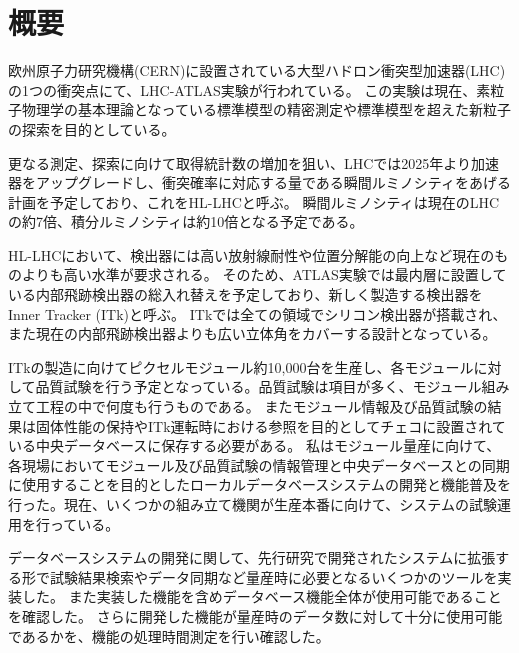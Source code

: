 \chapter*{概要}

欧州原子力研究機構(CERN)に設置されている大型ハドロン衝突型加速器(LHC)の1つの衝突点にて、LHC-ATLAS実験が行われている。
この実験は現在、素粒子物理学の基本理論となっている標準模型の精密測定や標準模型を超えた新粒子の探索を目的としている。

更なる測定、探索に向けて取得統計数の増加を狙い、LHCでは2025年より加速器をアップグレードし、衝突確率に対応する量である瞬間ルミノシティをあげる計画を予定しており、これをHL-LHCと呼ぶ。
瞬間ルミノシティは現在のLHCの約7倍、積分ルミノシティは約10倍となる予定である。

HL-LHCにおいて、検出器には高い放射線耐性や位置分解能の向上など現在のものよりも高い水準が要求される。
そのため、ATLAS実験では最内層に設置している内部飛跡検出器の総入れ替えを予定しており、新しく製造する検出器をInner Tracker (ITk)と呼ぶ。
ITkでは全ての領域でシリコン検出器が搭載され、また現在の内部飛跡検出器よりも広い立体角をカバーする設計となっている。

ITkの製造に向けてピクセルモジュール約10,000台を生産し、各モジュールに対して品質試験を行う予定となっている。品質試験は項目が多く、モジュール組み立て工程の中で何度も行うものである。
またモジュール情報及び品質試験の結果は固体性能の保持やITk運転時における参照を目的としてチェコに設置されている中央データベースに保存する必要がある。
私はモジュール量産に向けて、各現場においてモジュール及び品質試験の情報管理と中央データベースとの同期に使用することを目的としたローカルデータベースシステムの開発と機能普及を行った。現在、いくつかの組み立て機関が生産本番に向けて、システムの試験運用を行っている。

データベースシステムの開発に関して、先行研究で開発されたシステムに拡張する形で試験結果検索やデータ同期など量産時に必要となるいくつかのツールを実装した。
また実装した機能を含めデータベース機能全体が使用可能であることを確認した。
さらに開発した機能が量産時のデータ数に対して十分に使用可能であるかを、機能の処理時間測定を行い確認した。


